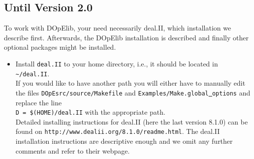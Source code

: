 \subsection{Until Version 2.0}
To work with DOpElib, your need necessarily deal.II, which installation 
we describe first. Afterwards, the DOpElib installation is described and finally
other optional packages might be installed.
\begin{itemize}
\item Install \texttt{deal.II} to your home directory, i.e., it should be located in \\
\texttt{\textasciitilde/deal.II}. \\[1mm]
If you would like to have another path you will either have to manually edit the files
\texttt{DOpEsrc/source/Makefile} and \texttt{Examples/Make.global\underline{ }options} and replace the 
line \\
\texttt{D = \$(HOME)/deal.II} with the appropriate path.\\[1mm]
Detailed installing instructions for deal.II (here the last version
8.1.0) can be found on 
\texttt{http://www.dealii.org/8.1.0/readme.html}. The deal.II 
installation instructions are descriptive enough and we omit 
any further comments and refer to their webpage.
%


\end{itemize}

